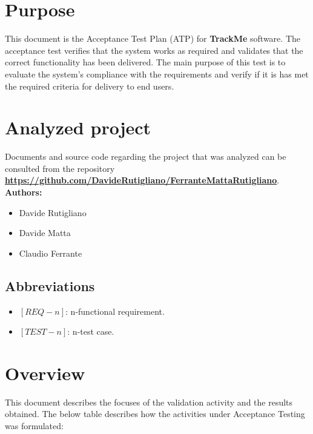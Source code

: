 \documentclass[a4paper, hidelinks, 12pt]{report}
\begin{document}
	\section{Purpose}
	This document is the Acceptance Test Plan (ATP) for \textbf{TrackMe} software. The acceptance test verifies that the system works as required and validates that the correct functionality has been delivered.  The main purpose of this test is to evaluate the system's compliance with the requirements and verify if it is has met the required criteria for delivery to end users. 
	
	\section{Analyzed project}
	Documents and source code regarding the project that was analyzed can be consulted from the repository 
		\href{https://github.com/DavideRutigliano/FerranteMattaRutigliano}{\textbf{https://github.com/DavideRutigliano/FerranteMattaRutigliano}}.\\
		
	\textbf{Authors: } 
	\begin{itemize}
		\item Davide Rutigliano
		\item Davide Matta
		\item Claudio Ferrante
	\end{itemize}
	
	\subsection{Abbreviations}
	\begin{itemize}
		\item $[REQ-n]$: n-functional requirement.
		\item $[TEST-n]$: n-test case.
	\end{itemize}

\section{Overview}
This document describes the focuses of the validation activity and the results obtained. The below table describes how the activities under Acceptance Testing was formulated:
\end{document}
